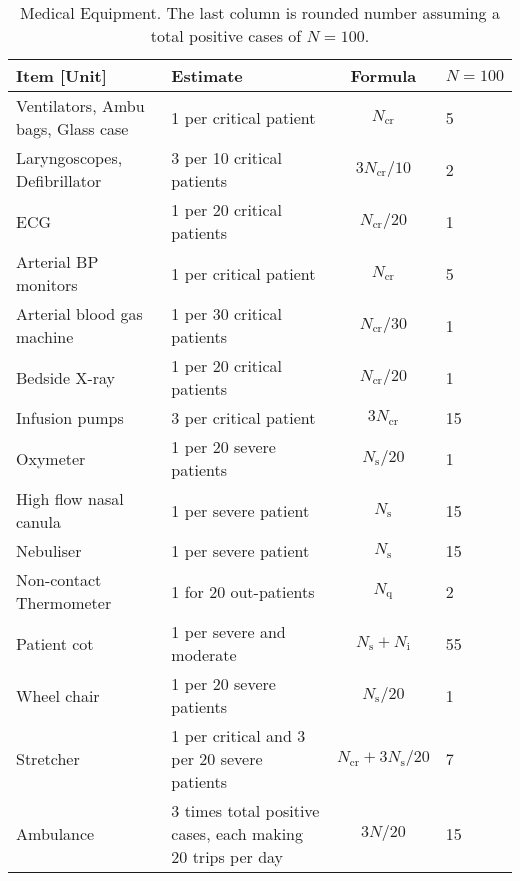 \documentclass{article}
\newcommand{\ncr}{\ensuremath{N_{\mathrm{cr}}}}
\newcommand{\ns}{\ensuremath{N_{\mathrm{s}}}}
\newcommand{\nin}{\ensuremath{N_{\mathrm{i}}}}
\newcommand{\nq}{\ensuremath{N_{\mathrm{q}}}}
\begin{document}
\begin{landscape}
\begin{table}
  \caption{Medical Equipment. The last column is
    rounded number assuming a total positive cases of $N=100$.}
  \begin{tabularx}{\linewidth}{XXcl}
    \toprule
    Item [Unit] & Estimate & Formula & $N=100$\\
    \midrule
    Ventilators, Ambu bags, Glass case & 1 per critical patient&
    $\ncr$ & 5 \\
    Laryngoscopes, Defibrillator & 3 per 10 critical patients &
    $3 \ncr/10$ & 2 \\
    ECG & 1 per 20 critical patients& $\ncr/20$ & 1\\
    Arterial BP monitors & 1 per critical patient &
    $\ncr$ & 5 \\
    Arterial blood gas machine & 1 per 30 critical patients &
    $\ncr/30$ & 1 \\
    Bedside X-ray & 1 per 20 critical patients & $\ncr/20$ & 1\\
    Infusion pumps & 3 per critical patient & $3 \ncr$ & 15 \\
    Oxymeter &  1 per 20 severe patients & $\ns/20$ & 1\\
    High flow nasal canula & 1 per severe patient & $\ns$ & 15\\
    Nebuliser & 1 per severe patient & $\ns$ & 15\\
    Non-contact Thermometer & 1 for 20 out-patients & $\nq$ & 2\\
    Patient cot & 1 per severe and moderate & $\ns+\nin$ & 55 \\
    Wheel chair & 1 per 20 severe patients & $\ns/20$ & 1\\
    Stretcher & 1 per critical and 3 per 20 severe patients &
    $\ncr + 3 \ns/20$ & 7\\
    Ambulance &  3 times total positive cases, each making 20 trips
    per day & $3 N / 20$ & 15\\
\bottomrule
\end{tabularx}
\end{table}
\end{landscape}
\end{document}
